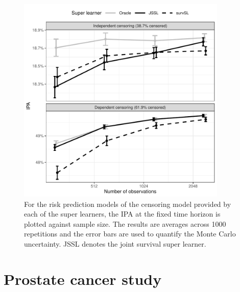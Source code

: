 \documentclass[a4paper,danish]{article}
\newcommand{\1}{\mathds{1}}
\theoremstyle{plain} %
\numberwithin{theorem}{section}
\theoremstyle{definition} %
\theoremstyle{remark}
\begin{document}
\begin{figure}[ht]
  \begin{center}
      \includegraphics[width=10cm]{experiment-fig-sl-survSL-cens}
  \end{center}
\caption{For the risk prediction models of the censoring model
    provided by each of the super learners, the IPA at the fixed time
    horizon is plotted against sample size. The results are averages
    across 1000 repetitions and the error bars are used to quantify
    the Monte Carlo uncertainty. JSSL denotes the joint survival super
    learner.}
\label{fig:zelefski-cens}
\end{figure}

\section{Prostate cancer study}
\label{sec:real-data-appl}
\end{document}
